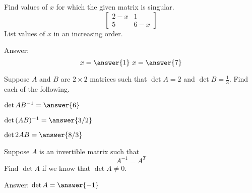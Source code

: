 \documentclass{ximera}
\begin{document}
  \begin{problem}\label{prob:singmatrixdet3}
    Find values of $x$ for which the given matrix is singular.
    $$\begin{bmatrix}2-x&1\\5&6-x\end{bmatrix}$$
    List values of $x$ in an increasing order.
     
    Answer:
    $$x=\answer{1}\quad x=\answer{7}$$
    \end{problem}

    \begin{problem}
      Suppose $A$ and $B$ are $2\times 2$ matrices such that $\det{A}=2$ and $\det{B}=\frac{1}{3}$.  Find each of the following.
        \begin{problem}\label{prob:detproduct1a}
        $\det{AB^{-1}}=\answer{6}$
        \end{problem}
         
         \begin{problem}\label{prob:detproduct1b}
        $\det{(AB)^{-1}}=\answer{3/2}$
        \end{problem}
         
         \begin{problem}\label{prob:detproduct1c}
        $\det{2AB}=\answer{8/3}$
        \end{problem}
      \end{problem}

   
  \begin{problem}\label{prob:detinvertible1}
  Suppose $A$ is an invertible matrix such that $$A^{-1}=A^T$$
  Find $\det{A}$ if we know that $\det{A}\neq 0$.
   
  Answer: $\det{A}=\answer{-1}$
  \end{problem}
\end{document}
